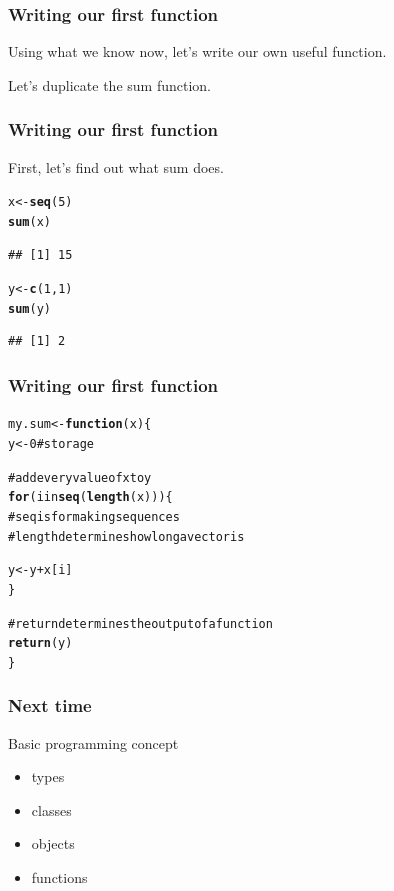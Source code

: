\documentclass{beamer}\usepackage{graphicx, color}
\makeatletter
\newcommand{\hlfunctioncall}[1]{\textcolor[rgb]{0.501960784313725,0,0.329411764705882}{\textbf{#1}}}%
\newcommand{\hlcomment}[1]{\textcolor[rgb]{0.180392156862745,0.6,0.341176470588235}{#1}}%
\newenvironment{kframe}{%
 \def\at@end@of@kframe{}%
 \ifinner\ifhmode%
  \def\at@end@of@kframe{\end{minipage}}%
  \begin{minipage}{\columnwidth}%
 \fi\fi%
 \def\FrameCommand##1{\hskip\@totalleftmargin \hskip-\fboxsep
 \colorbox{shadecolor}{##1}\hskip-\fboxsep
     \hskip-\linewidth \hskip-\@totalleftmargin \hskip\columnwidth}%
 \MakeFramed {\advance\hsize-\width
   \@totalleftmargin\z@ \linewidth\hsize
   \@setminipage}}%
 {\par\unskip\endMakeFramed%
 \at@end@of@kframe}
\newenvironment{knitrout}{}{} %
\makeatother
\begin{document}
\begin{frame}
  \frametitle{Writing our first function}
  Using what we know now, let's write our own useful function.

  Let's duplicate the sum function.

\end{frame}

\begin{frame}[fragile]
  \frametitle{Writing our first function}

  First, let's find out what sum does.

\begin{knitrout}\small
{}\color{fgcolor}\begin{kframe}
\begin{alltt}
x <- \hlfunctioncall{seq}(5)
\hlfunctioncall{sum}(x)
\end{alltt}
\begin{verbatim}
## [1] 15
\end{verbatim}
\begin{alltt}

y <- \hlfunctioncall{c}(1, 1)
\hlfunctioncall{sum}(y)
\end{alltt}
\begin{verbatim}
## [1] 2
\end{verbatim}
\end{kframe}
\end{knitrout}


\end{frame}

\begin{frame}[fragile]
  \frametitle{Writing our first function}

\begin{knitrout}\small
{}\color{fgcolor}\begin{kframe}
\begin{alltt}
my.sum <- \hlfunctioncall{function}(x) \{
  y <- 0  \hlcomment{# storage}

\hlcomment{  # add every value of x to y}
  \hlfunctioncall{for}(i in \hlfunctioncall{seq}(\hlfunctioncall{length}(x))) \{  
\hlcomment{    # seq is for making sequences }
\hlcomment{    # length determines how long a vector is}
    
    y <- y + x[i]
  \}

\hlcomment{  # return determines the output of a function}
  \hlfunctioncall{return}(y)
\}
\end{alltt}
\end{kframe}
\end{knitrout}


\end{frame}

\begin{frame}
  \frametitle{Next time}

  Basic programming concept
  \begin{itemize}
    \item types
    \item classes
    \item objects
    \item functions
  \end{itemize}

\end{frame}
\end{document}

